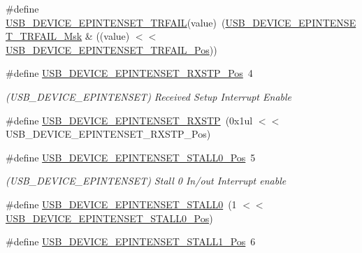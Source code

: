 \begin{DoxyCompactItemize}
\item 
\#define \mbox{\hyperlink{group___s_a_m_d21___u_s_b_ga4b3c9c5b701a223ea0b26c6fb649f578}{U\+S\+B\+\_\+\+D\+E\+V\+I\+C\+E\+\_\+\+E\+P\+I\+N\+T\+E\+N\+S\+E\+T\+\_\+\+T\+R\+F\+A\+IL}}(value)~(\mbox{\hyperlink{group___s_a_m_d21___u_s_b_gab738dde9c4627324310b1a3394777cad}{U\+S\+B\+\_\+\+D\+E\+V\+I\+C\+E\+\_\+\+E\+P\+I\+N\+T\+E\+N\+S\+E\+T\+\_\+\+T\+R\+F\+A\+I\+L\+\_\+\+Msk}} \& ((value) $<$$<$ \mbox{\hyperlink{group___s_a_m_d21___u_s_b_ga2c7e0bcecd62a0b34cfe393b85e4ebe5}{U\+S\+B\+\_\+\+D\+E\+V\+I\+C\+E\+\_\+\+E\+P\+I\+N\+T\+E\+N\+S\+E\+T\+\_\+\+T\+R\+F\+A\+I\+L\+\_\+\+Pos}}))
\item 
\#define \mbox{\hyperlink{group___s_a_m_d21___u_s_b_gaee0c453573f16300f3bf3e826ea2d5f2}{U\+S\+B\+\_\+\+D\+E\+V\+I\+C\+E\+\_\+\+E\+P\+I\+N\+T\+E\+N\+S\+E\+T\+\_\+\+R\+X\+S\+T\+P\+\_\+\+Pos}}~4
\begin{DoxyCompactList}\small\item\em (U\+S\+B\+\_\+\+D\+E\+V\+I\+C\+E\+\_\+\+E\+P\+I\+N\+T\+E\+N\+S\+ET) Received Setup Interrupt Enable \end{DoxyCompactList}\item 
\#define \mbox{\hyperlink{group___s_a_m_d21___u_s_b_gaaa235c7f4fcde68a23da7e6955fcd42d}{U\+S\+B\+\_\+\+D\+E\+V\+I\+C\+E\+\_\+\+E\+P\+I\+N\+T\+E\+N\+S\+E\+T\+\_\+\+R\+X\+S\+TP}}~(0x1ul $<$$<$ U\+S\+B\+\_\+\+D\+E\+V\+I\+C\+E\+\_\+\+E\+P\+I\+N\+T\+E\+N\+S\+E\+T\+\_\+\+R\+X\+S\+T\+P\+\_\+\+Pos)
\item 
\#define \mbox{\hyperlink{group___s_a_m_d21___u_s_b_ga9d4e0dafc83af56ed91e31e805585a56}{U\+S\+B\+\_\+\+D\+E\+V\+I\+C\+E\+\_\+\+E\+P\+I\+N\+T\+E\+N\+S\+E\+T\+\_\+\+S\+T\+A\+L\+L0\+\_\+\+Pos}}~5
\begin{DoxyCompactList}\small\item\em (U\+S\+B\+\_\+\+D\+E\+V\+I\+C\+E\+\_\+\+E\+P\+I\+N\+T\+E\+N\+S\+ET) Stall 0 In/out Interrupt enable \end{DoxyCompactList}\item 
\#define \mbox{\hyperlink{group___s_a_m_d21___u_s_b_ga654556e67670bc0974213b6d14f521fb}{U\+S\+B\+\_\+\+D\+E\+V\+I\+C\+E\+\_\+\+E\+P\+I\+N\+T\+E\+N\+S\+E\+T\+\_\+\+S\+T\+A\+L\+L0}}~(1 $<$$<$ \mbox{\hyperlink{group___s_a_m_d21___u_s_b_ga9d4e0dafc83af56ed91e31e805585a56}{U\+S\+B\+\_\+\+D\+E\+V\+I\+C\+E\+\_\+\+E\+P\+I\+N\+T\+E\+N\+S\+E\+T\+\_\+\+S\+T\+A\+L\+L0\+\_\+\+Pos}})
\item 
\#define \mbox{\hyperlink{group___s_a_m_d21___u_s_b_gad0872c85a0766d55328337d4692af92f}{U\+S\+B\+\_\+\+D\+E\+V\+I\+C\+E\+\_\+\+E\+P\+I\+N\+T\+E\+N\+S\+E\+T\+\_\+\+S\+T\+A\+L\+L1\+\_\+\+Pos}}~6
$$
\end{DoxyCompactItemize}
